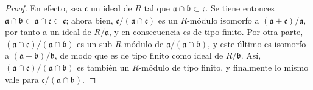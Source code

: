 \begin{proof}
En efecto, sea $\mathfrak c$ un ideal de $R$ tal que
$\mathfrak a\cap\mathfrak b\subset\mathfrak c$. Se tiene entonces
$\mathfrak a\cap\mathfrak b\subset\mathfrak a\cap\mathfrak c\subset
\mathfrak c$; ahora bien, $\mathfrak c/(\mathfrak a\cap\mathfrak c)$
es un $R$-módulo isomorfo a
$(\mathfrak a+\mathfrak c)/\mathfrak a$, por tanto a un ideal de
$R/\mathfrak a$, y en consecuencia es de tipo finito. Por otra
parte, $(\mathfrak a\cap\mathfrak c)/(\mathfrak a\cap\mathfrak b)$
es un sub-$R$-módulo de
$\mathfrak a/(\mathfrak a\cap\mathfrak b)$, y este último es
isomorfo a $(\mathfrak a+\mathfrak b)/\mathfrak b$, de modo que es
de tipo finito como ideal de $R/\mathfrak b$. Así,
$(\mathfrak a\cap\mathfrak c)/(\mathfrak a\cap\mathfrak b)$ es
también un $R$-módulo de tipo finito, y finalmente lo mismo vale
para $\mathfrak c/(\mathfrak a\cap\mathfrak b)$.
\end{proof}


